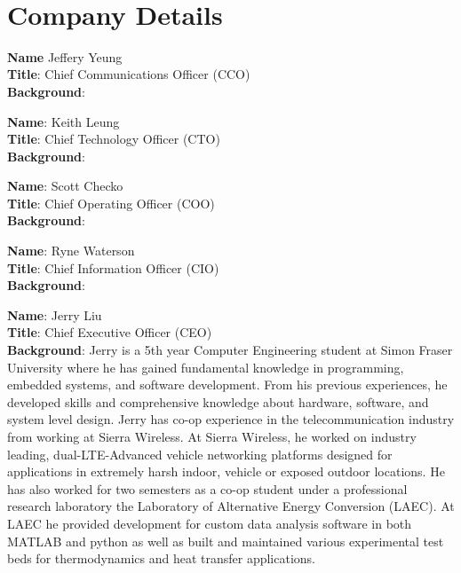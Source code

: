 

\setcounter{section}{5}
\
\section{Company Details}

\bigskip
\textbf{Name} Jeffery Yeung \\
\medskip
\textbf{Title}: Chief Communications Officer (CCO)\\
\medskip
\textbf{Background}:

\bigskip
\bigskip
\textbf{Name}:  Keith Leung\\
\medskip
\textbf{Title}: Chief Technology Officer (CTO) \\
\medskip
\textbf{Background}:

\bigskip
\bigskip
\textbf{Name}: Scott Checko\\
\medskip
\textbf{Title}: Chief Operating Officer (COO)\\
\medskip
\textbf{Background}:


\pagebreak
\textbf{Name}: Ryne Waterson\\
\medskip
\textbf{Title}: Chief Information Officer (CIO)\\
\medskip
\textbf{Background}:

\bigskip
\bigskip
\textbf{Name}: Jerry Liu \\
\medskip
\textbf{Title}: Chief Executive Officer (CEO) \\
\medskip
\textbf{Background}: Jerry is a 5th year Computer Engineering student at Simon Fraser University where he has gained fundamental knowledge in programming, embedded systems, and  software development. From his previous experiences, he developed skills and comprehensive knowledge about hardware, software, and system level design. Jerry has co-op experience in the telecommunication industry from working at Sierra Wireless. At Sierra Wireless, he worked on industry leading, dual-LTE-Advanced vehicle networking platforms designed for applications in extremely harsh indoor, vehicle or exposed outdoor locations. He has also worked for two semesters as a co-op student under a professional research laboratory the Laboratory of Alternative Energy Conversion (LAEC). At LAEC he provided development for custom data analysis software in both MATLAB and python as well as built and maintained various experimental test beds for thermodynamics and heat transfer applications.

